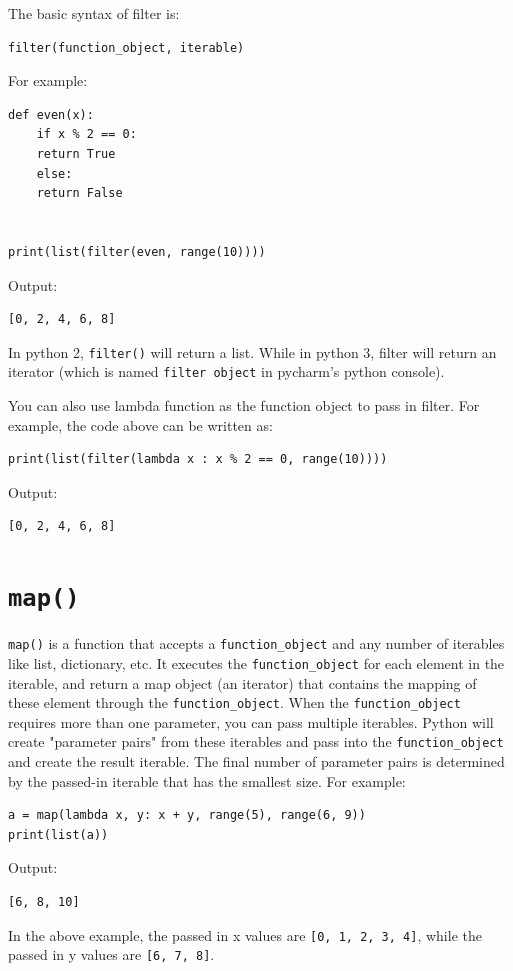 \documentclass[12pt]{book}
\begin{document}
The basic syntax of filter is:
\begin{verbatim}
filter(function_object, iterable)
\end{verbatim}
For example:
\begin{verbatim}
def even(x):
    if x % 2 == 0:
	return True
    else:
	return False


print(list(filter(even, range(10))))
\end{verbatim}
Output:
\begin{verbatim}
[0, 2, 4, 6, 8]
\end{verbatim}
In python 2, \texttt{filter()} will return a list. While in python 3, filter will return an iterator (which is named \texttt{filter object} in pycharm's python console).

You can also use lambda function as the function object to pass in filter. For example, the code above can be written as:
\begin{verbatim}
print(list(filter(lambda x : x % 2 == 0, range(10))))
\end{verbatim}
Output:
\begin{verbatim}
[0, 2, 4, 6, 8]
\end{verbatim}
\section{\texttt{map()}}
\label{sec:org259359a}
\texttt{map()} is a function that accepts a \texttt{function\_object} and any number of iterables like list, dictionary, etc. It executes the \texttt{function\_object} for each element in the iterable, and return a map object (an iterator) that contains the mapping of these element through the \texttt{function\_object}. When the \texttt{function\_object} requires more than one parameter, you can pass multiple iterables. Python will create "parameter pairs" from these iterables and pass into the \texttt{function\_object} and create the result iterable. The final number of parameter pairs is determined by the passed-in iterable that has the smallest size. For example:
\begin{verbatim}
a = map(lambda x, y: x + y, range(5), range(6, 9))
print(list(a))
\end{verbatim}
Output:
\begin{verbatim}
[6, 8, 10]
\end{verbatim}
In the above example, the passed in x values are \texttt{[0, 1, 2, 3, 4]}, while the passed in y values are \texttt{[6, 7, 8]}. 
\end{document}
